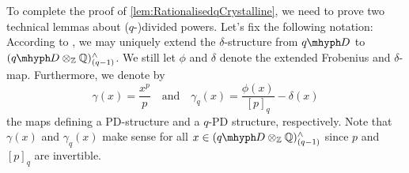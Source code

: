 \documentclass[DIV=12,numbers=enddot,leqno,bibliography=totoc]{scrartcl}
\begin{document}
	To complete the proof of \cref{lem:RationalisedqCrystalline}, we need to prove two technical lemmas about ($q$\nobreakdash-)di\-vided powers. Let's fix the following notation: According to \cite[Lemmas~ and~]{Prismatic}, we may uniquely extend the $\delta$-structure from $\q D$ to $(\q D\otimes_{\IZ}\IQ)_{(q-1)}^\complete$. We still let $\phi$ and $\delta$ denote the extended Frobenius and $\delta$-map. Furthermore, we denote by
	\begin{equation*}
		\gamma(x)=\frac{x^p}{p}\quad\text{and}\quad \gamma_q(x)=\frac{\phi(x)}{[p]_q}-\delta(x)
	\end{equation*}
	the maps defining a PD-structure and a $q$-PD structure, respectively. 
	Note that $\gamma(x)$ and $\gamma_q(x)$ make sense for all $x\in(\q D\otimes_{\IZ}\IQ)_{(q-1)}^\complete$ since $p$ and $[p]_q$ are invertible.
	
\end{document}
